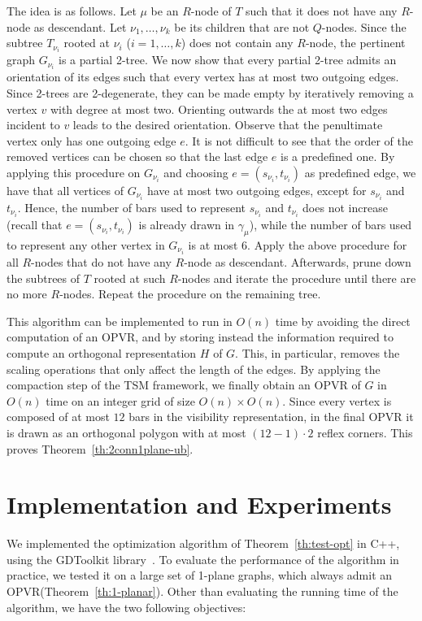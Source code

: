 \documentclass{article}
\newcommand{\opvr}{OPVR\xspace}
\begin{document}
The idea is as follows. Let $\mu$ be an $R$-node of $T$ such that it does not have any $R$-node as descendant. Let $\nu_1,\dots,\nu_k$ be its children that are not $Q$-nodes. Since the subtree $T_{\nu_i}$ rooted at $\nu_i$ ($i=1,\dots,k$) does not contain any $R$-node, the pertinent graph $G_{\nu_i}$ is a partial 2-tree. We now show that every partial 2-tree admits an orientation of its edges such that every vertex has at most two outgoing edges. Since 2-trees are 2-degenerate, they can be made empty by iteratively removing a vertex $v$ with degree at most two. Orienting outwards the at most two  edges incident to $v$ leads to the desired orientation. Observe that the penultimate vertex only has one outgoing edge $e$. It is not difficult to see that the order of the removed vertices can be chosen so that the last edge $e$ is a predefined one. By applying this procedure on $G_{\nu_i}$ and choosing $e=(s_{\nu_i},t_{\nu_i})$ as predefined edge, we have that all vertices of $G_{\nu_i}$ have at most two outgoing edges, except for $s_{\nu_i}$ and $t_{\nu_i}$. Hence, the number of bars used to represent $s_{\nu_i}$ and $t_{\nu_i}$ does not increase (recall that $e=(s_{\nu_i},t_{\nu_i})$ is already drawn in $\gamma_\mu$), while the number of bars used to represent any other vertex in $G_{\nu_i}$ is at most 6. Apply the above procedure for all $R$-nodes that do not have any $R$-node as descendant. Afterwards, prune down the subtrees of $T$ rooted at such $R$-nodes and iterate the procedure until there are no more $R$-nodes. Repeat the procedure on the remaining tree.

This algorithm can be implemented to run in $O(n)$ time by avoiding the direct computation of an \opvr, and by storing instead the information required to compute an orthogonal representation $H$ of $G$. This, in particular, removes the scaling operations that only affect the length of the edges. By applying the compaction step of the TSM framework, we finally obtain an \opvr of $G$ in $O(n)$ time on an integer grid of size $O(n) \times O(n)$. Since every vertex is composed of at most $12$ bars in the visibility representation, in the final \opvr it is drawn as an orthogonal polygon with at most $(12-1)\cdot 2$ reflex corners.  This proves Theorem~\ref{th:2conn1plane-ub}.



\section{Implementation and Experiments}\label{se:experiments}
We implemented the optimization algorithm of Theorem~\ref{th:test-opt} in C++, using the GDToolkit library~\cite{gdt-13}. To evaluate the performance of the algorithm in practice, we tested it on a large set of 1-plane graphs, which always admit an \opvr (Theorem~\ref{th:1-planar}). Other than evaluating the running time of the algorithm, we have the two following objectives:
\end{document}
